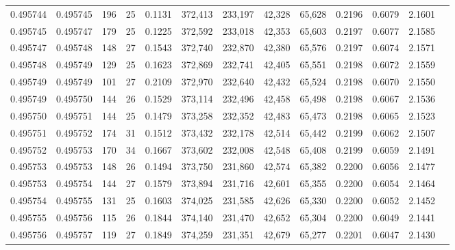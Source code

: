 \begin{tabular}{rrrrrrrrrrrrr}
0.495744 & 0.495745 & 196 &  25 &                                     0.1131 & 372,413 & 233,197 &  42,328 &  65,628 & 0.2196 & 0.6079 & 2.1601 \\
0.495745 & 0.495747 & 179 &  25 &                                     0.1225 & 372,592 & 233,018 &  42,353 &  65,603 & 0.2197 & 0.6077 & 2.1585 \\
0.495747 & 0.495748 & 148 &  27 &                                     0.1543 & 372,740 & 232,870 &  42,380 &  65,576 & 0.2197 & 0.6074 & 2.1571 \\
0.495748 & 0.495749 & 129 &  25 &                                     0.1623 & 372,869 & 232,741 &  42,405 &  65,551 & 0.2198 & 0.6072 & 2.1559 \\
0.495749 & 0.495749 & 101 &  27 &                                     0.2109 & 372,970 & 232,640 &  42,432 &  65,524 & 0.2198 & 0.6070 & 2.1550 \\
0.495749 & 0.495750 & 144 &  26 &                                     0.1529 & 373,114 & 232,496 &  42,458 &  65,498 & 0.2198 & 0.6067 & 2.1536 \\
0.495750 & 0.495751 & 144 &  25 &                                     0.1479 & 373,258 & 232,352 &  42,483 &  65,473 & 0.2198 & 0.6065 & 2.1523 \\
0.495751 & 0.495752 & 174 &  31 &                                     0.1512 & 373,432 & 232,178 &  42,514 &  65,442 & 0.2199 & 0.6062 & 2.1507 \\
0.495752 & 0.495753 & 170 &  34 &                                     0.1667 & 373,602 & 232,008 &  42,548 &  65,408 & 0.2199 & 0.6059 & 2.1491 \\
0.495753 & 0.495753 & 148 &  26 &                                     0.1494 & 373,750 & 231,860 &  42,574 &  65,382 & 0.2200 & 0.6056 & 2.1477 \\
0.495753 & 0.495754 & 144 &  27 &                                     0.1579 & 373,894 & 231,716 &  42,601 &  65,355 & 0.2200 & 0.6054 & 2.1464 \\
0.495754 & 0.495755 & 131 &  25 &                                     0.1603 & 374,025 & 231,585 &  42,626 &  65,330 & 0.2200 & 0.6052 & 2.1452 \\
0.495755 & 0.495756 & 115 &  26 &                                     0.1844 & 374,140 & 231,470 &  42,652 &  65,304 & 0.2200 & 0.6049 & 2.1441 \\
0.495756 & 0.495757 & 119 &  27 &                                     0.1849 & 374,259 & 231,351 &  42,679 &  65,277 & 0.2201 & 0.6047 & 2.1430 \\

\end{tabular}
